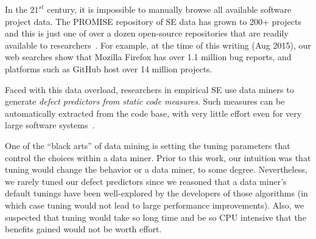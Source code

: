 \documentclass{sig-alternative}
\begin{document}
In the $21^{st}$ century, it is  impossible
to manually browse all  available software project
data. The PROMISE repository of SE data has grown to 200+ projects~\cite{promise15}
and this is just one of over a dozen open-source repositories
that are readily available to researchers~\cite{rod12}.
For example, at the time of this writing (Aug  2015), our web searches show that Mozilla Firefox has over 1.1 million bug reports, and platforms such as GitHub host over 14 million projects. 

Faced with this data overload,
researchers in empirical SE
use  data miners  to generate 
{\em defect predictors from static code measures}.
Such   measures can be
automatically extracted from the code base, with very little effort
even for very large software systems~\cite{nagappan05}. 

One of the ``black arts'' of data mining is setting the tuning
parameters that control  the choices within a data miner.
Prior to this work, our intuition was that tuning would change the behavior or a data miner, to some degree. Nevertheless, we rarely tuned our  defect predictors 
since we reasoned
that a data miner's default tunings have been well-explored by the developers of those algorithms (in which case
tuning would not lead to large performance improvements).
Also, we suspected that
tuning would take so long time and be so CPU intensive that the benefits gained   would not be worth effort.
\end{document}
